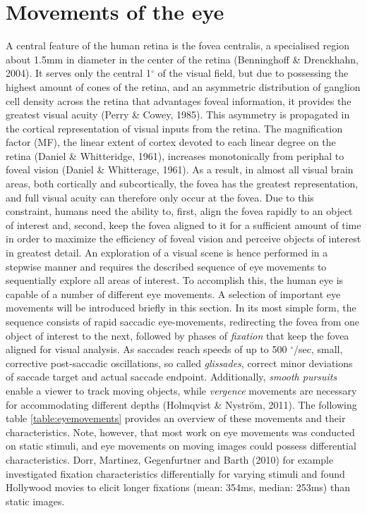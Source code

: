 \documentclass[a4paper, 12pt]{scrreprt}
\begin{document}
\section{Movements of the eye}\label{section:eyemoves}
A central feature of the human retina is the fovea centralis, a specialised region about 1.5mm in diameter in the center of the retina (Benninghoff \& Drenckhahn, 2004). It serves only the central 1$^\circ$ of the visual field, but due to possessing the highest amount of cones of the retina, and an asymmetric distribution of ganglion cell density across the retina that advantages foveal information, it provides the greatest visual acuity (Perry \& Cowey, 1985). This asymmetry is propagated in the cortical representation of visual inputs from the retina. The magnification factor (MF), the linear extent of cortex devoted to each linear degree on the retina (Daniel \& Whitteridge, 1961), increases monotonically from periphal to foveal vision (Daniel \& Whitterage, 1961). As a result, in almost all visual brain areas, both cortically and subcortically, the fovea has the greatest representation, and full visual acuity can therefore only occur at the fovea. 
Due to this constraint, humans need the ability to, first, align the fovea rapidly to an object of interest and, second, keep the fovea aligned to it for a sufficient amount of time in order to maximize the efficiency of foveal vision and perceive objects of interest in greatest detail. An exploration of a visual scene is hence performed in a stepwise manner and requires the described sequence of eye movements to sequentially explore all areas of interest. To accomplish this, the human eye is capable of a number of different eye movements. A selection of important eye movements will be introduced briefly in this section. \newline
In its most simple form, the sequence consists of rapid saccadic eye-movements, redirecting the fovea from one object of interest to the next, followed by phases of \textit{fixation} that keep the fovea aligned for visual analysis. As saccades reach speeds of up to 500 $^\circ$/sec, small, corrective post-saccadic oscillations, so called \textit{glissades}, correct minor deviations of saccade target and actual saccade endpoint. Additionally, \textit{smooth pursuits} enable a viewer to track moving objects, while \textit{vergence} movements are necessary for accommodating different depths (Holmqvist \& Nyström, 2011). The following table \ref{table:eyemovements} provides an overview of these movements and their characteristics. Note, however, that most work on eye movements was conducted on static stimuli, and eye movements on moving images could possess differential characteristics. Dorr, Martinez, Gegenfurtner and Barth (2010) for example investigated fixation characteristics differentially for varying stimuli and found Hollywood movies to elicit longer fixations (mean: 354ms, median: 253ms) than static images. \newline
  
\end{document}
